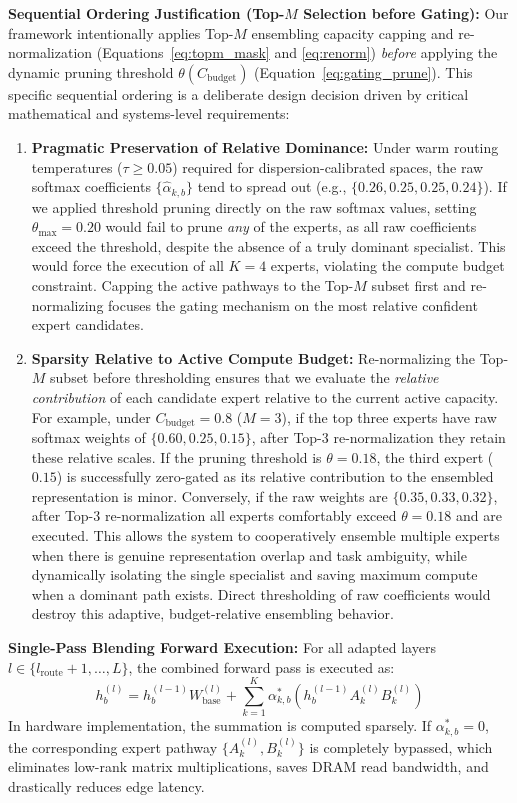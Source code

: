 \textbf{Sequential Ordering Justification (Top-$M$ Selection before Gating):} Our framework intentionally applies Top-$M$ ensembling capacity capping and re-normalization (Equations~\ref{eq:topm_mask} and \ref{eq:renorm}) \emph{before} applying the dynamic pruning threshold $\theta(C_{\text{budget}})$ (Equation~\ref{eq:gating_prune}). This specific sequential ordering is a deliberate design decision driven by critical mathematical and systems-level requirements:
\begin{enumerate}
    \item \textbf{Pragmatic Preservation of Relative Dominance:} Under warm routing temperatures ($\tau \ge 0.05$) required for dispersion-calibrated spaces, the raw softmax coefficients $\{\hat{\alpha}_{k,b}\}$ tend to spread out (e.g., $\{0.26, 0.25, 0.25, 0.24\}$). If we applied threshold pruning directly on the raw softmax values, setting $\theta_{\max} = 0.20$ would fail to prune \emph{any} of the experts, as all raw coefficients exceed the threshold, despite the absence of a truly dominant specialist. This would force the execution of all $K=4$ experts, violating the compute budget constraint. Capping the active pathways to the Top-$M$ subset first and re-normalizing focuses the gating mechanism on the most relative confident expert candidates.
    \item \textbf{Sparsity Relative to Active Compute Budget:} Re-normalizing the Top-$M$ subset before thresholding ensures that we evaluate the \emph{relative contribution} of each candidate expert relative to the current active capacity. For example, under $C_{\text{budget}} = 0.8$ ($M=3$), if the top three experts have raw softmax weights of $\{0.60, 0.25, 0.15\}$, after Top-$3$ re-normalization they retain these relative scales. If the pruning threshold is $\theta = 0.18$, the third expert ($0.15$) is successfully zero-gated as its relative contribution to the ensembled representation is minor. Conversely, if the raw weights are $\{0.35, 0.33, 0.32\}$, after Top-3 re-normalization all experts comfortably exceed $\theta = 0.18$ and are executed. This allows the system to cooperatively ensemble multiple experts when there is genuine representation overlap and task ambiguity, while dynamically isolating the single specialist and saving maximum compute when a dominant path exists. Direct thresholding of raw coefficients would destroy this adaptive, budget-relative ensembling behavior.
\end{enumerate}

\textbf{Single-Pass Blending Forward Execution:}
For all adapted layers $l \in \{l_{\text{route}} + 1, \dots, L\}$, the combined forward pass is executed as:
\begin{equation}
h_b^{(l)} = h_b^{(l-1)} W_{\text{base}}^{(l)} + \sum_{k=1}^K \alpha^*_{k, b} \left( h_b^{(l-1)} A_k^{(l)} B_k^{(l)} \right)
\label{eq:forward}
\end{equation}
In hardware implementation, the summation is computed sparsely. If $\alpha^*_{k, b} = 0$, the corresponding expert pathway $\{A_k^{(l)}, B_k^{(l)}\}$ is completely bypassed, which eliminates low-rank matrix multiplications, saves DRAM read bandwidth, and drastically reduces edge latency.
